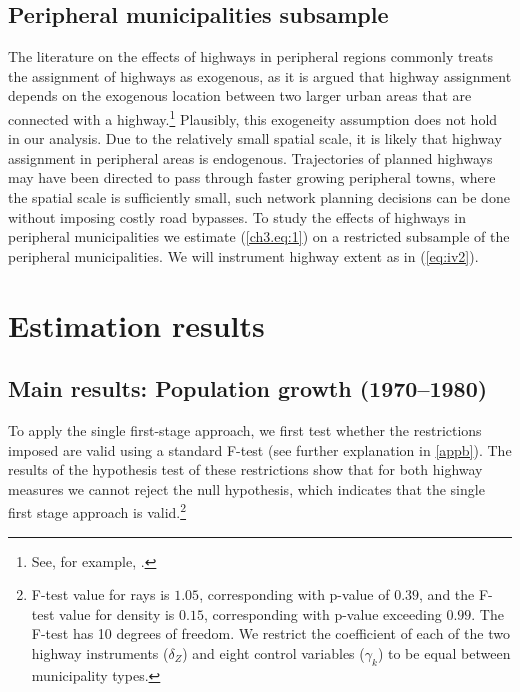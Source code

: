 \documentclass[a4paper,authoryear,review]{elsarticle}  	%
\begin{document}
\subsection{Peripheral municipalities subsample}		
	The literature on the effects of highways in peripheral regions commonly treats the assignment of highways as exogenous, as it is argued that highway assignment depends on the exogenous location between two larger urban areas that are connected with a highway.\footnote{See, for example, \citet{Chandra2000,Fajgelbaum2014,Michaels2008}.} Plausibly, this exogeneity assumption does not hold in our analysis. Due to the relatively small spatial scale, it is likely that highway assignment in peripheral areas is endogenous. Trajectories of planned highways may have been directed to pass through faster growing peripheral towns, where the spatial scale is sufficiently small, such network planning decisions can be done without imposing costly road bypasses. To study the effects of highways in peripheral municipalities we estimate (\ref{ch3.eq:1}) on a restricted subsample of the peripheral municipalities. We will instrument highway extent as in (\ref{eq:iv2}). %


\section{Estimation results}
\subsection{Main results: Population growth (1970--1980)}
	To apply the single first-stage approach, we first test whether the restrictions imposed are valid using a standard F-test (see further explanation in \ref{appb}). The results of the hypothesis test of these restrictions show that for both highway measures we cannot reject the null hypothesis, which indicates that the single first stage approach is valid.\footnote{F-test value for rays is $1.05$, corresponding with p-value of $0.39$, and the F-test value for density is $0.15$, corresponding with p-value exceeding $0.99$. The F-test has 10 degrees of freedom. We restrict the coefficient of each of the two highway instruments ($\delta_Z$) and eight control variables ($\gamma_k$) to be equal between municipality types.}
	
\end{document}
